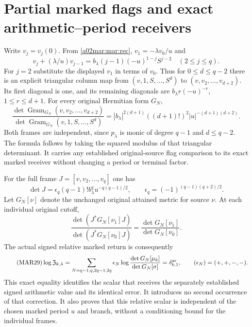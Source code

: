 \documentclass[11pt,a4paper]{article}
\begin{document}
\section{Partial marked flags and exact arithmetic--period receivers}
Write $v_j=v_j(0)$. From \eqref{a02mar:mar:rec},
$v_1=-\lambda v_0/u$ and
\[
 v_j+(\lambda/u)v_{j-1}=b_\lambda(j-1)(-u)^{1-j}S^{j-2}
           \quad(2\le j\le q).
\]
For $j=2$ substitute the displayed $v_1$ in terms of $v_0$.
Thus for $0\le d\le q-2$ there is an explicit triangular
column map from $(v,1,S,\ldots,S^d)$ to
$(v,v_2,\ldots,v_{d+2})$. Its first diagonal is one, and its
remaining diagonals are $b_\lambda r(-u)^{-r}$,
$1\le r\le d+1$. For every original Hermitian form $G_N$,
\begin{equation}\tag{MAR27}\label{a02mar:mar:partialgram}
 \frac{\det\operatorname{Gram}_{G_N}(v,v_2,\ldots,v_{d+2})}
      {\det\operatorname{Gram}_{G_N}(v,1,S,\ldots,S^d)}
 =|b_\lambda|^{2(d+1)}((d+1)!)^2|u|^{-(d+1)(d+2)}.
\end{equation}
Both frames are independent, since $p_\lambda$ is monic of
degree $q-1$ and $d\le q-2$. The formula follows by taking
the squared modulus of that triangular determinant. It carries
any established original-source flag comparison to its exact
marked receiver without changing a period or terminal factor.

For the full frame $J=[v,v_2,\ldots,v_q]$ one has
\[
 \det J=\epsilon_q(q-1)!b_\lambda^q u^{-q(q-1)/2},\qquad
 \epsilon_q=(-1)^{(q-1)(q+2)/2}.
\]
Let $G_N[\nu]$ denote the unchanged original attained metric for
source $\nu$. At each individual original cutoff,
\begin{equation}\tag{MAR28}\label{a02mar:mar:relative}
 \frac{\det(J^*G_N[\nu_1]J)}{\det(J^*G_N[\nu_0]J)}
       =\frac{\det G_N[\nu_1]}{\det G_N[\nu_0]}.
\end{equation}
The actual signed relative marked return is consequently
\begin{equation}\tag{MAR29}\label{a02mar:mar:Z}
 \log\mathfrak Z_{k,\lambda}
 =\sum_{N=q-1,q,2q-1,2q}\epsilon_N
       \log\frac{\det G_N[\mu_k]}{\det G_N[\sigma]}
 =\delta_{k,1}^{\rm ar},\qquad(\epsilon_N)=(+,+,-,-).
\end{equation}
This exact equality identifies the scalar that receives the
separately established signed arithmetic value and its identical
error. It introduces no second occurrence of that correction.
It also proves that this relative scalar is independent of the
chosen marked period $u$ and branch, without a conditioning bound
for the individual frames.
\end{document}
